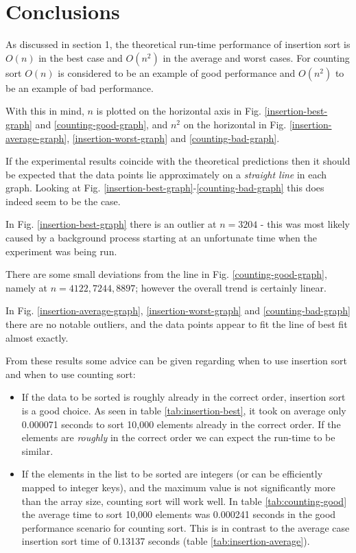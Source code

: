 \documentclass{article}
\begin{document}
\section{Conclusions}
As discussed in section 1, the theoretical run-time performance of insertion sort is $O(n)$ in the best case and $O(n^2)$ in the average and worst cases. For counting sort $O(n)$ is considered to be an example of good performance and $O(n^2)$ to be an example of bad performance.

With this in mind, $n$ is plotted on the horizontal axis in Fig. \ref{insertion-best-graph} and \ref{counting-good-graph}, and $n^2$ on the horizontal in Fig. \ref{insertion-average-graph}, \ref{insertion-worst-graph} and \ref{counting-bad-graph}.

If the experimental results coincide with the theoretical predictions then it should be expected that the data points lie approximately on a \textit{straight line} in each graph. Looking at Fig. \ref{insertion-best-graph}-\ref{counting-bad-graph} this does indeed seem to be the case.

In Fig. \ref{insertion-best-graph} there is an outlier at $n=3204$ - this was most likely caused by a background process starting at an unfortunate time when the experiment was being run.

There are some small deviations from the line in Fig. \ref{counting-good-graph}, namely at $n=4122, 7244, 8897$; however the overall trend is certainly linear.

In Fig. \ref{insertion-average-graph}, \ref{insertion-worst-graph} and \ref{counting-bad-graph} there are no notable outliers, and the data points appear to fit the line of best fit almost exactly.

From these results some advice can be given regarding when to use insertion sort and when to use counting sort:

\begin{itemize}

\item{
If the data to be sorted is roughly already in the correct order, insertion sort is a good choice. As seen in table \ref{tab:insertion-best}, it took on average only 0.000071 seconds to sort 10,000 elements already in the correct order. If the elements are \textit{roughly} in the correct order we can expect the run-time to be similar.
}

\item{
If the elements in the list to be sorted are integers (or can be efficiently mapped to integer keys), and the maximum value is not significantly more than the array size, counting sort will work well. In table \ref{tab:counting-good} the average time to sort 10,000 elements was 0.000241 seconds in the good performance scenario for counting sort. This is in contrast to the average case insertion sort time of 0.13137 seconds (table \ref{tab:insertion-average}).
}

\end{itemize}
\end{document}
